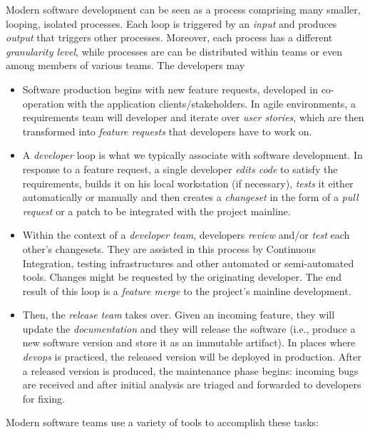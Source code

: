 \documentclass[]{book}
\begin{document}
Modern software development can be seen as a process comprising many
smaller, looping, isolated processes. Each loop is triggered by an
\emph{input} and produces \emph{output} that triggers other processes.
Moreover, each process has a different \emph{granularity level}, while
processes are can be distributed within teams or even among members of
various teams. The developers may

\begin{itemize}
\item
  Software production begins with new feature requests, developed in
  co-operation with the application clients/stakeholders. In agile
  environments, a requirements team will developer and iterate over
  \emph{user stories}, which are then transformed into \emph{feature
  requests} that developers have to work on.
\item
  A \emph{developer} loop is what we typically associate with software
  development. In response to a feature request, a single developer
  \emph{edits code} to satisfy the requirements, builds it on his local
  workstation (if necessary), \emph{tests} it either automatically or
  manually and then creates a \emph{changeset} in the form of a
  \emph{pull request} or a patch to be integrated with the project
  mainline.
\item
  Within the context of a \emph{developer team}, developers
  \emph{review} and/or \emph{test} each other's changesets. They are
  assisted in this process by Continuous Integration, testing
  infrastructures and other automated or semi-automated tools. Changes
  might be requested by the originating developer. The end result of
  this loop is a \emph{feature merge} to the project's mainline
  development.
\item
  Then, the \emph{release team} takes over. Given an incoming feature,
  they will update the \emph{documentation} and they will release the
  software (i.e., produce a new software version and store it as an
  immutable artifact). In places where \emph{devops} is practiced, the
  released version will be deployed in production. After a released
  version is produced, the maintenance phase begins: incoming bugs are
  received and after initial analysis are triaged and forwarded to
  developers for fixing.
\end{itemize}

Modern software teams use a variety of tools to accomplish these tasks:
\end{document}
